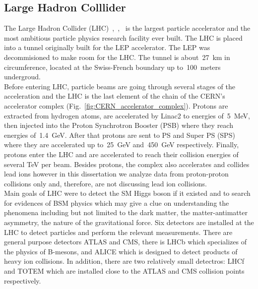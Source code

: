\subsection{Large Hadron Colllider}
\label{sec:Exp_LHC}
The Large Hadron Collider (LHC)~\cite{ref_LHC_brochure},~\cite{ref_LHC_TDR},~\cite{ref_LHC_website} is the largest particle accelerator and the most ambitious particle physics research facility ever built. The LHC is placed into a tunnel originally built for the LEP accelerator. The LEP was decommisioned to make room for the LHC. The tunnel is about~27~km in circumference, located at the Swiss-French boundary up to~100~meters undergroud.\\

Before entering LHC, particle beams are going through several stages of the acceleration and the LHC is the last element of the chain of the CERN's accelerator complex (Fig.~\ref{fig:CERN_accelerator_complex}). Protons are extracted from hydrogen atoms, are accelerated by Linac2 to energies of~5~MeV, then injected into the Proton Synchrotron Booster (PSB) where they reach energies of~1.4~GeV. After that protons are sent to PS and Super PS (SPS) where they are accelerated up to~25~GeV and~450~GeV respectively. Finally, protons enter the LHC and are accelerated to reach their collision energies of several TeV per beam. Besides protons, the complex also accelerates and collides lead ions however in this dissertation we analyze data from proton-proton collisions only and, therefore, are not discussing lead ion collisions.\\    



Main goals of LHC were to detect the SM Higgs boson if it existed and to search for evidences of BSM physics which may give a clue on understanding the phenomena including but not limited to the dark matter, the matter-antimatter asymmetry, the nature of the gravitational force. Six detectors are installed at the LHC to detect particles and perform the relevant measurements. There are general purpose detectors ATLAS and CMS, there is LHCb which specializes of the physics of B-mesons, and ALICE which is designed to detect products of heavy ion collisions. In addition, there are two relatively small detectros: LHCf and TOTEM which are installed close to the ATLAS and CMS collision points respectively. \\

